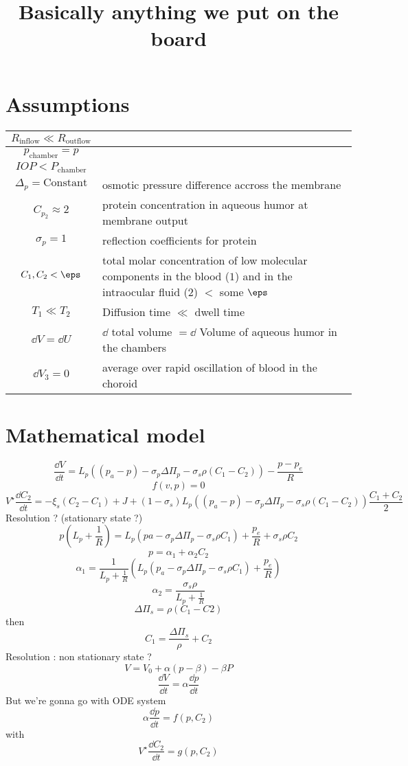 \documentclass[11pt]{article}
\author{}
\title{Basically anything we put on the board}
\date{}
\begin{document}
\maketitle
\section{Assumptions}
\begin{center}
\begin{tabular}{|c|p{}|}
\hline
$R_{\mathrm{inflow}} \ll R_{\mathrm{outflow}}$&\\
\hline
$p_{\mathrm{chamber}} = p$&\\
\hline
$IOP < P_{\mathrm{chamber}}$&\\
\hline
$\Delta_p = \mathrm{Constant}$&osmotic pressure difference accross the membrane\\
\hline
$C_{p_2} \approx 2$ &protein concentration in aqueous humor at membrane output \\
\hline
$\sigma_p = 1 $ &reflection coefficients for protein\\
\hline
$C_1,C_2 < \eps$ & total molar concentration of low molecular components in the blood ($1$) and in the intraocular fluid ($2$) $<$ some  $\eps$\\
\hline
$T_1 \ll T_2$ & Diffusion time $\ll$ dwell time \\
\hline
$\dd V = \dd U$ & $\dd$ total volume $= \dd$ Volume of aqueous humor in the chambers \\
\hline
$\dd V_3 =0 $ & average over rapid oscillation of blood in the choroid\\
\hline
\end{tabular}
\end{center}


\section{Mathematical model}
\[
\frac{\dd V}{\dd t} = L_{p} \left( (p_{a} -p) - \sigma_{p} \Delta \Pi_{p} - \sigma_{s} \rho (C_{1}- C_{2}) \right) - \frac{p - p_{e} }{R}
\]
\[
f(v,p) = 0
\]
\[
V^\star \frac{\dd C_2}{\dd t} = - \xi_s (C_2-C_1) + J + \left(1- \sigma_s\right)L_p\left((p_a-p) - \sigma_p \Delta \Pi_p - \sigma_s \rho (C_1-C_2) \right) \frac{C_1 + C_2}{2}
\]
Resolution ? (stationary state ?)
\[
p\left( L_p + \frac{1}{R} \right) = L_p \left(pa - \sigma_p \Delta \Pi_p - \sigma_s \rho C_1\right) + \frac{p_e}{R} + \sigma_s \rho C_2
\]
\[
p = \alpha_1 + \alpha_2 C_2
\]
\[
\alpha_1 = \frac{1}{L_p + \frac{1}{R}} \left( L_p \left( p_a - \sigma_p \Delta \Pi_p - \sigma_s \rho C_1 \right) + \frac{p_e}{R}\right)
\]
\[
\alpha_2 = \frac{\sigma_s \rho}{L_p + \frac{1}{R}}
\]
\[
\Delta \Pi_s = \rho (C_1 - C2)
\]
then 
\[
C_1 = \frac{\Delta \Pi_s}{\rho} + C_2
\]
Resolution : non stationary state ? 
\[
V = V_0 + \alpha (p - \beta ) - \beta P
\]
\[
\frac{\dd V}{\dd t}= \alpha \frac{\dd p}{\dd t}
\]
But we're gonna go with ODE system
\[
\alpha \frac{\dd p}{\dd t} = f(p, C_2)
\]
with
\[
V^\star \frac{\dd C_2}{\dd t} = g(p, C_2)
\]
\end{document}
